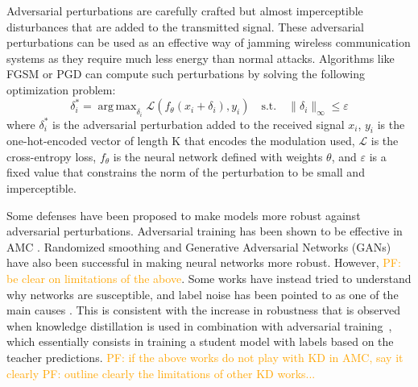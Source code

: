 \documentclass[conference]{IEEEtran}
\newcommand{\pf}[1]{{\textcolor{orange}{PF: {#1}}}}
\newcommand{\Ls}{\mathcal{L}}
\DeclareMathOperator*{\argmax}{arg\,max}
\begin{document}
%
Adversarial perturbations are carefully crafted but almost imperceptible disturbances that are added to the transmitted signal. These adversarial perturbations can be used as an effective way of jamming wireless communication systems as they require much less energy than normal attacks. Algorithms like FGSM \cite{Goodfellow_Shlens_Szegedy_2015} or PGD \cite{Madry_Makelov_Schmidt_Tsipras_Vladu_2019} can compute such perturbations by solving the following optimization problem:
\begin{equation}
\label{eq:adv_pert}
    \delta_i^* = \argmax_{\delta_i}\Ls(f_{\theta}(x_i + \delta_i), y_i) \quad \text{s.t.} \quad \lVert \delta_i \rVert_{\infty} \leq \varepsilon
\end{equation}
where $\delta_i^*$ is the adversarial perturbation added to the received signal $x_i$, $y_i$ is the one-hot-encoded vector of length K that encodes the modulation used, $\Ls$ is the cross-entropy loss, $f_{\theta}$ is the neural network defined with weights $\theta$, and $\varepsilon$ is a fixed value that constrains the norm of the perturbation to be small and imperceptible.

Some defenses have been proposed to make models more robust against adversarial perturbations. Adversarial training \cite{Madry_Makelov_Schmidt_Tsipras_Vladu_2019} has been shown to be effective in AMC \cite{maroto2021safeamc,manoj2022toward}. Randomized smoothing \cite{kim2021channel,manoj2022toward} and Generative Adversarial Networks (GANs) \cite{wang2022gan} have also been successful in making neural networks more robust. However, \pf{be clear on limitations of the above}. Some works have instead tried to understand why networks are susceptible, and label noise has been pointed to as one of the main causes \cite{sanyal2020benign}. This is consistent with the increase in robustness that is observed when knowledge distillation is used in combination with adversarial training~\cite{goldblum2020adversarially,zi2021revisiting,shao2021and,maroto2022benefits}, which essentially consists in training a student model with labels based on the teacher predictions. \pf{if the above works do not play with KD in AMC, say it clearly} \pf{outline clearly the limitations of other KD works...}

\end{document}
